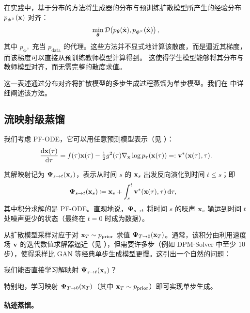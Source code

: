 在实践中，基于分布的方法将生成器的分布与预训练扩散模型所产生的经验分布 $p_{\bm{\phi}^\times}({\mathbf{x}})$ 对齐：
\[
\min_{\bm{\theta}}  \mathcal{D}\!\left(p_{\bm{\theta}}(\hat{{\mathbf{x}}}),  p_{\bm{\phi}^\times}(\hat{{\mathbf{x}}})\right),
\]
其中 $p_{\bm{\phi}^\times}$ 充当 $p_{\mathrm{data}}$ 的代理。这些方法并不显式地计算该散度，而是逼近其梯度，而该梯度可以直接从预训练教师模型计算得到。
这使得学生模型能够将其分布与教师模型对齐，而无需完整的散度求值。

这一表述通过分布对齐将扩散模型的多步生成过程蒸馏为单步模型。我们在  中详细阐述该方法。




\subsection{流映射级蒸馏} 我们考虑 PF-ODE，它可以用任意预测模型表示（见 ）：
\begin{align}\label{eq:pf-ode-ct}
    \frac{\mathop{}\!\mathrm{d} {\mathbf{x}}(\tau)}{\mathop{}\!\mathrm{d} \tau} 
    = f(\tau) {\mathbf{x}}(\tau) - \tfrac{1}{2}g^2(\tau) \nabla_{\mathbf{x}} \log p_\tau({\mathbf{x}}(\tau)) 
    =: {\mathbf{v}}^*({\mathbf{x}}(\tau), \tau).
\end{align}

其解映射记为 ${\bm{\Psi}}_{s\to t}({\mathbf{x}}_s)$，表示从时间 $s$ 的 ${\mathbf{x}}_s$ 出发反向演化到时间 $t \leq s$；即
\begin{align}\label{eq:int_target_gt}
\begin{aligned}
    {\bm{\Psi}}_{s\to t}({\mathbf{x}}_s) 
    &\coloneqq {\mathbf{x}}_s + \int_s^t {\mathbf{v}}^*({\mathbf{x}}(\tau), \tau) \mathop{}\!\mathrm{d} \tau,
\end{aligned}
\end{align}
其中积分求解的是 PF-ODE。直观地说，${\bm{\Psi}}_{s\to t}$ 将时间 $s$ 的噪声 ${\mathbf{x}}_s$ 输运到时间 $t$ 处噪声更少的状态（最终在 $t=0$ 时成为数据）。


从扩散模型采样对应于对 ${\mathbf{x}}_T \sim p_{\mathrm{prior}}$ 求值 ${\bm{\Psi}}_{T\to 0}({\mathbf{x}}_T)$。通常，该积分由利用速度场 ${\mathbf{v}}$ 的迭代数值求解器逼近（见 ），但需要许多步（例如 DPM-Solver 中至少 $10$ 步），使得采样比 GAN 等经典单步生成模型更慢。这引出一个自然的问题：
\begin{question}
    我们能否直接学习解映射 ${\bm{\Psi}}_{s\to t}({\mathbf{x}}_s)$？
\end{question}
特别地，学习映射 ${\bm{\Psi}}_{T\to 0}({\mathbf{x}}_T)$（其中 ${\mathbf{x}}_T \sim p_{\mathrm{prior}}$）即可实现单步生成。


\paragraph{轨迹蒸馏。}

